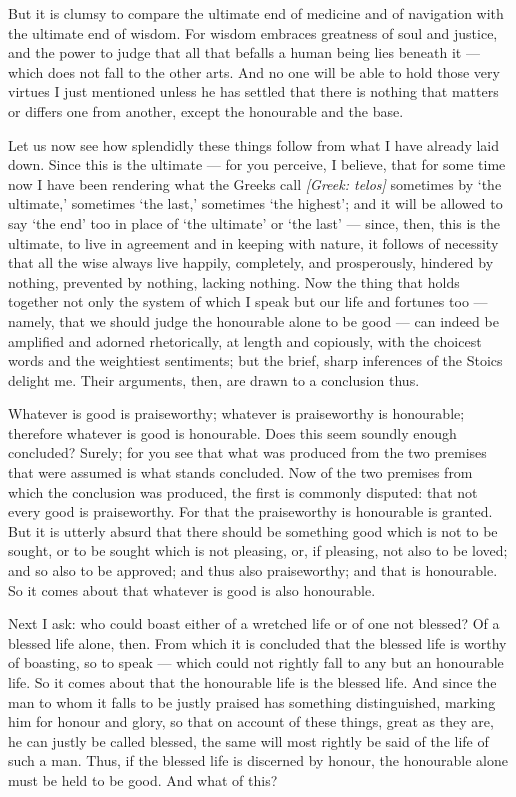 But it is clumsy to compare the ultimate end of medicine and of navigation with the ultimate end of wisdom. For wisdom embraces greatness of soul and justice, and the power to judge that all that befalls a human being lies beneath it — which does not fall to the other arts. And no one will be able to hold those very virtues I just mentioned unless he has settled that there is nothing that matters or differs one from another, except the honourable and the base.

 Let us now see how splendidly these things follow from what I have already laid down. Since this is the ultimate — for you perceive, I believe, that for some time now I have been rendering what the Greeks call \textit{[Greek: telos]} sometimes by `the ultimate,' sometimes `the last,' sometimes `the highest'; and it will be allowed to say `the end' too in place of `the ultimate' or `the last' — since, then, this is the ultimate, to live in agreement and in keeping with nature, it follows of necessity that all the wise always live happily, completely, and prosperously, hindered by nothing, prevented by nothing, lacking nothing. Now the thing that holds together not only the system of which I speak but our life and fortunes too — namely, that we should judge the honourable alone to be good — can indeed be amplified and adorned rhetorically, at length and copiously, with the choicest words and the weightiest sentiments; but the brief, sharp inferences of the Stoics delight me. Their arguments, then, are drawn to a conclusion thus.

 Whatever is good is praiseworthy; whatever is praiseworthy is honourable; therefore whatever is good is honourable. Does this seem soundly enough concluded? Surely; for you see that what was produced from the two premises that were assumed is what stands concluded. Now of the two premises from which the conclusion was produced, the first is commonly disputed: that not every good is praiseworthy. For that the praiseworthy is honourable is granted. But it is utterly absurd that there should be something good which is not to be sought, or to be sought which is not pleasing, or, if pleasing, not also to be loved; and so also to be approved; and thus also praiseworthy; and that is honourable. So it comes about that whatever is good is also honourable.

 Next I ask: who could boast either of a wretched life or of one not blessed? Of a blessed life alone, then. From which it is concluded that the blessed life is worthy of boasting, so to speak — which could not rightly fall to any but an honourable life. So it comes about that the honourable life is the blessed life. And since the man to whom it falls to be justly praised has something distinguished, marking him for honour and glory, so that on account of these things, great as they are, he can justly be called blessed, the same will most rightly be said of the life of such a man. Thus, if the blessed life is discerned by honour, the honourable alone must be held to be good. And what of this?

